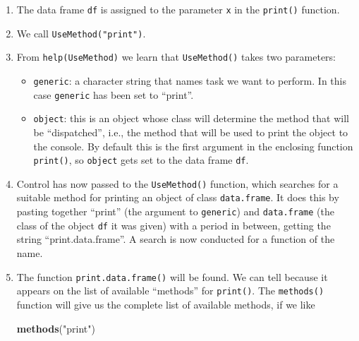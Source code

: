 \documentclass[]{book}
\makeatletter
\newenvironment{Shaded}{\begin{snugshade}}{\end{snugshade}}
\newcommand{\KeywordTok}[1]{\textcolor[rgb]{0.13,0.29,0.53}{\textbf{{#1}}}}
\newcommand{\StringTok}[1]{\textcolor[rgb]{0.31,0.60,0.02}{{#1}}}
\newcommand{\NormalTok}[1]{{#1}}
\providecommand{\tightlist}{%
  \setlength{\itemsep}{0pt}\setlength{\parskip}{0pt}}
\newenvironment{kframe}{%
\medskip{}
\setlength{\fboxsep}{.8em}
 \def\at@end@of@kframe{}%
 \ifinner\ifhmode%
  \def\at@end@of@kframe{\end{minipage}}%
  \begin{minipage}{\columnwidth}%
 \fi\fi%
 \def\FrameCommand##1{\hskip\@totalleftmargin \hskip-\fboxsep
 \colorbox{shadecolor}{##1}\hskip-\fboxsep
     \hskip-\linewidth \hskip-\@totalleftmargin \hskip\columnwidth}%
 \MakeFramed {\advance\hsize-\width
   \@totalleftmargin\z@ \linewidth\hsize
   \@setminipage}}%
 {\par\unskip\endMakeFramed%
 \at@end@of@kframe}
\renewenvironment{Shaded}{\begin{kframe}}{\end{kframe}}
\theoremstyle{definition}
\theoremstyle{definition}
\theoremstyle{remark}
\makeatother
\begin{document}
{\begin{enumerate}
\def\labelenumi{\arabic{enumi}.}
\item
  The data frame \texttt{df} is assigned to the parameter \texttt{x} in
  the \texttt{print()} function.
\item
  We call \texttt{UseMethod("print")}.
\item
  From \texttt{help(UseMethod)} we learn that \texttt{UseMethod()} takes
  two parameters:

  \begin{itemize}
  \tightlist
  \item
    \texttt{generic}: a character string that names task we want to
    perform. In this case \texttt{generic} has been set to ``print''.
  \item
    \texttt{object}: this is an object whose class will determine the
    method that will be ``dispatched'', i.e., the method that will be
    used to print the object to the console. By default this is the
    first argument in the enclosing function \texttt{print()}, so
    \texttt{object} gets set to the data frame \texttt{df}.
  \end{itemize}
\item
  Control has now passed to the \texttt{UseMethod()} function, which
  searches for a suitable method for printing an object of class
  \texttt{data.frame}. It does this by pasting together ``print'' (the
  argument to \texttt{generic}) and \texttt{data.frame} (the class of
  the object \texttt{df} it was given) with a period in between, getting
  the string ``print.data.frame''. A search is now conducted for a
  function of the name.
\item
  The function \texttt{print.data.frame()} will be found. We can tell
  because it appears on the list of available ``methods'' for
  \texttt{print()}. The \texttt{methods()} function
   will give us the
  complete list of available methods, if we like

\begin{Shaded}
\begin{Highlighting}[]
\KeywordTok{methods}\NormalTok{(}\StringTok{"print"}\NormalTok{)}
\end{Highlighting}
\end{Shaded}


\end{enumerate}}
\end{document}
